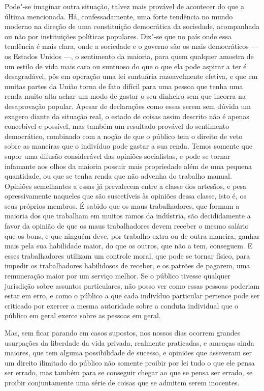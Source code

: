 Pode"-se imaginar outra situação, talvez mais provável de acontecer do
que a última mencionada. Há, confessadamente, uma forte tendência no
mundo moderno na direção de uma constituição democrática da sociedade,
acompanhada ou não por instituições políticas populares. Diz"-se que
no país onde essa tendência é mais clara, onde a sociedade e o governo
são os mais democráticos --- os Estados Unidos ---, o sentimento da maioria, para quem qualquer
amostra de um estilo de vida mais caro ou suntuoso do que o que ela
pode aspirar a ter é desagradável, pôs em operação uma lei suntuária
razoavelmente efetiva, e que em muitas partes da União torna de fato
difícil para uma pessoa que tenha uma renda muito alta achar um modo de
gastar o seu dinheiro sem que incorra na desaprovação popular. Apesar
de declarações como essas serem sem dúvida um exagero diante da
situação real, o estado de coisas assim descrito não é apenas
concebível e possível, mas também um resultado provável do sentimento
democrático, combinado com a noção de que o público tem o direito de
veto sobre as maneiras que o indivíduo pode gastar a sua renda. Temos
somente que supor uma difusão considerável das opiniões socialistas, e
pode se tornar infamante aos olhos da maioria possuir mais propriedade
além de uma pequena quantidade, ou que se tenha renda que não advenha
do trabalho manual. Opiniões semelhantes a essas já prevalecem entre a
classe dos artesãos, e pesa opressivamente naqueles que são
suscetíveis às opiniões dessa classe, isto é, os seus próprios
membros. É sabido que os maus trabalhadores, que formam a maioria dos
que trabalham em muitos ramos da indústria, são decididamente a favor
da opinião de que os maus trabalhadores devem receber o mesmo salário
que os bons, e que ninguém deve, por trabalho extra ou de outra
maneira, ganhar mais pela sua habilidade maior, do que os outros, que
não a tem, conseguem. E esses trabalhadores utilizam um controle moral,
que pode se tornar físico, para impedir os trabalhadores
habilidosos de receber, e os patrões de pagarem, uma remuneração maior
por um serviço melhor. Se o público tivesse qualquer jurisdição sobre
assuntos particulares, não posso ver como essas pessoas poderiam estar
em erro, e como o público a que cada indivíduo particular pertence pode
ser criticado por exercer a mesma autoridade sobre a conduta individual
que o público em geral exerce sobre as pessoas em geral. 

Mas, sem ficar parando em casos supostos, nos nossos dias ocorrem
grandes usurpações da liberdade da vida privada, realmente praticadas,
e ameaças ainda maiores, que tem alguma possibilidade de sucesso, e
opiniões que asseveram ser um direito ilimitado do público não somente
proibir por lei tudo o que ele pensa ser errado, mas também para se
conseguir chegar ao que se pensa ser errado, se proibir conjuntamente
uma série de coisas que se admitem serem inocentes. 

